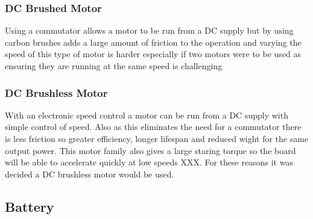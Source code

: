 \documentclass[journal,10pt]{IEEEtran}
\begin{document}
        \subsubsection{DC Brushed Motor}
            Using a commutator allows a motor to be run from a DC supply but by using carbon brushes adds a large amount of friction to the operation and varying the speed of this type of motor is harder especially if two motors were to be used as ensuring they are running at the same speed is challenging
        \subsubsection{DC Brushless Motor}
            With an electronic speed control a motor can be run from a DC supply with simple control of speed. Also as this eliminates the need for a commutator there is less friction so greater efficiency, longer lifespan and reduced wight for the same output power. This motor family also gives a large staring torque so the board will be able to accelerate quickly at low speeds XXX. For these reasons it was decided a DC brushless motor would be used.
    \subsection{Battery}
\end{document}

